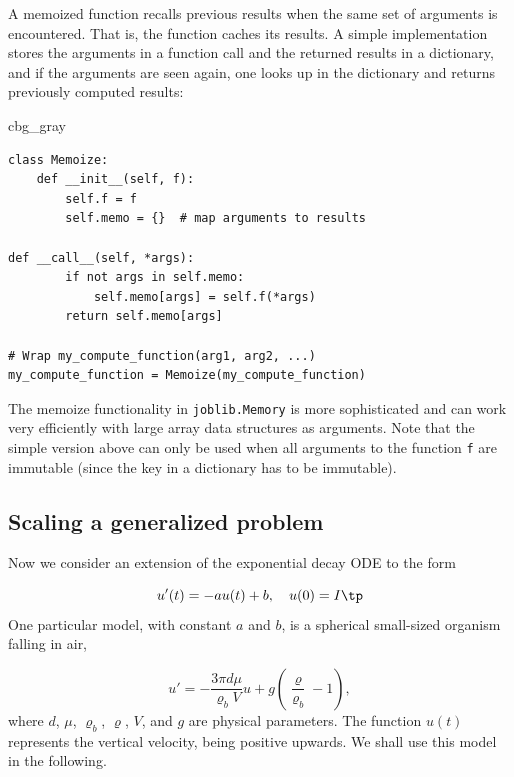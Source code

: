 \documentclass[graybox,envcountchap,sectrefs,final]{svmonodo}
\newenvironment{_cod_tight}[1]{
   \def\FrameCommand{\colorbox{#1}}
   \FrameRule0.6pt\MakeFramed {\FrameRestore}\vskip3mm}
   {\vskip0mm\endMakeFramed}
\newenvironment{cod}[1]{
\bgroup\rmfamily
\fboxsep=0mm\relax
\begin{_cod_tight}{#1}
\list{}{\parsep=-2mm\parskip=0mm\topsep=0pt\leftmargin=2mm
\rightmargin=2\leftmargin\leftmargin=4pt\relax}
\item\relax}
{\endlist\end{_cod_tight}\egroup}
\newenvironment{notice_mdfboxadmon}[1][]{
\begin{notice_mdfboxmdframed}[frametitle=#1]
}
{
\end{notice_mdfboxmdframed}
}
\begin{document}
\begin{notice_mdfboxadmon}
A memoized function recalls
previous results when the same set
of arguments is encountered. That is, the function caches its results.
A simple implementation stores the arguments in a function call and
the returned results in a
dictionary, and if the arguments are seen again, one looks up
in the dictionary and returns previously computed results:

\begin{cod}{cbg_gray}\begin{Verbatim}[numbers=none,fontsize=\fontsize{9pt}{9pt},baselinestretch=0.95,xleftmargin=2mm]
class Memoize:
    def __init__(self, f):
        self.f = f
        self.memo = {}  # map arguments to results

def __call__(self, *args):
        if not args in self.memo:
            self.memo[args] = self.f(*args)
        return self.memo[args]

# Wrap my_compute_function(arg1, arg2, ...)
my_compute_function = Memoize(my_compute_function)
\end{Verbatim}
\end{cod}
\noindent
The memoize functionality in \texttt{joblib.Memory} is more sophisticated and
can work very efficiently with large array data structures as arguments.
Note that the simple version above can only be used when all arguments to
the function \texttt{f} are immutable (since the key in a dictionary has to be
immutable).
\end{notice_mdfboxadmon}



\subsection{Scaling a generalized problem}
\label{sec:scale:decay:body}

Now we consider an extension of the exponential decay ODE to the
form

\begin{equation}
u'(t) = -au(t) + b,\quad u(0)=I
\label{scale:decay:model:g}
\tp
\end{equation}
One particular model, with constant $a$ and $b$,
is a spherical small-sized organism falling in air,

\begin{equation}
u' = - \frac{3\pi d\mu}{\varrho_b V} u + g\left(\frac{\varrho}{\varrho_b} -1\right),
\label{scale:decay:model:g:spec}
\end{equation}
where $d$, $\mu$, $\varrho_b$, $\varrho$, $V$, and $g$ are physical
parameters. The function $u(t)$ represents the vertical velocity,
being positive upwards.
We shall use this model in the following.
\end{document}
